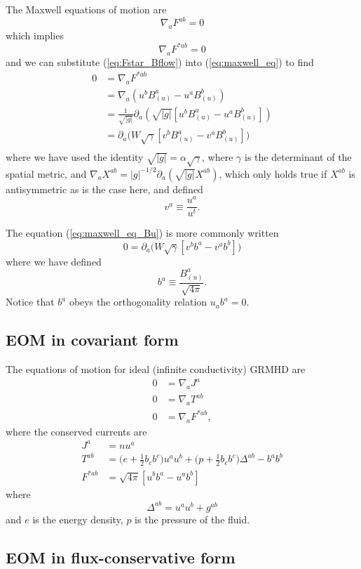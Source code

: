 \documentclass[12pt]{article}
\numberwithin{equation}{section}
\begin{document}
The Maxwell equations of motion are
\begin{equation}
\nabla_{a} F^{ab} = 0
\end{equation}
which implies
\begin{equation} \label{eq:maxwell_eq}
\nabla_{a} F^{*ab} = 0
\end{equation}
and we can substitute (\ref{eq:Fstar_Bflow}) into (\ref{eq:maxwell_eq}) to find
\begin{equation} \label{eq:maxwell_eq_Bu}
\begin{aligned}
0 &= \nabla_{a} F^{*ab} \\
&= \nabla_{a} (u^b B^{a}_{(u)} - u^a B^{b}_{(u)}) \\
&= \frac{1}{\sqrt{|g|}} \partial_{a} (\sqrt{|g|} [u^b B^{a}_{(u)} - u^a B^{b}_{(u)}]) \\
&= \partial_{a} \Big( W \sqrt{\gamma} [v^b B^{a}_{(u)} - v^a B^{b}_{(u)}] \Big) \\
\end{aligned}
\end{equation}
where we have used the identity $\sqrt{|g|} = \alpha \sqrt{\gamma}$, where $\gamma$ is the determinant of the spatial metric, and $\nabla_{a} X^{ab} = |g|^{-1/2} \partial_a (\sqrt{|g|} X^{ab})$, which only holds true if $X^{ab}$ is antisymmetric as is the case here, and defined
\begin{equation}
v^a \equiv \frac{u^a}{u^t}.
\end{equation}

The equation (\ref{eq:maxwell_eq_Bu}) is more commonly written
\begin{equation}
0 = \partial_{a} \Big( W \sqrt{\gamma} [v^b b^{a} - v^a b^{b}] \Big)
\end{equation}
where we have defined
\begin{equation} \label{eq:ba}
b^{a} \equiv \frac{B^{a}_{(u)}}{\sqrt{4 \pi}}.
\end{equation}
Notice that $b^a$ obeys the orthogonality relation $u_a b^a = 0$.

\subsection{EOM in covariant form}

The equations of motion for ideal (infinite conductivity) GRMHD are
\begin{align}
0 &= \nabla_{a} J^{a}    \\
0 &= \nabla_{a} T^{ab}   \\
0 &= \nabla_{a} F^{*ab},
\end{align}
where the conserved currents are
\begin{align}
J^{a} &= n u^a \\
T^{ab} &= \Big( e + \frac{1}{2} b_c b^c \Big) u^a u^b + \Big( p + \frac{1}{2} b_c b^c \Big) \Delta^{ab} - b^a b^b  \\
F^{*ab} &= \sqrt{4 \pi} [u^b b^{a} - u^a b^{b}]
\end{align}
where
\begin{equation}
\Delta^{ab} = u^a u^b + g^{ab}
\end{equation}
and $e$ is the energy density, $p$ is the pressure of the fluid.

\subsection{EOM in flux-conservative form}
\end{document}
